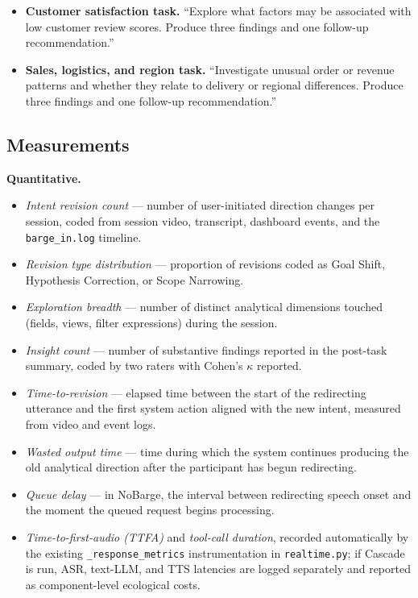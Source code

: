 \documentclass[journal]{IEEEtran}
\begin{document}
\begin{itemize}
\item \textbf{Customer satisfaction task.} ``Explore what factors may be associated with low customer review scores. Produce three findings and one follow-up recommendation.''
\item \textbf{Sales, logistics, and region task.} ``Investigate unusual order or revenue patterns and whether they relate to delivery or regional differences. Produce three findings and one follow-up recommendation.''
\end{itemize}

\subsection{Measurements}
\textbf{Quantitative.}
\begin{itemize}
\item \emph{Intent revision count} --- number of user-initiated direction changes per session, coded from session video, transcript, dashboard events, and the \texttt{barge\_in.log} timeline.
\item \emph{Revision type distribution} --- proportion of revisions coded as Goal Shift, Hypothesis Correction, or Scope Narrowing.
\item \emph{Exploration breadth} --- number of distinct analytical dimensions touched (fields, views, filter expressions) during the session.
\item \emph{Insight count} --- number of substantive findings reported in the post-task summary, coded by two raters with Cohen's $\kappa$ reported.
\item \emph{Time-to-revision} --- elapsed time between the start of the redirecting utterance and the first system action aligned with the new intent, measured from video and event logs.
\item \emph{Wasted output time} --- time during which the system continues producing the old analytical direction after the participant has begun redirecting.
\item \emph{Queue delay} --- in NoBarge, the interval between redirecting speech onset and the moment the queued request begins processing.
\item \emph{Time-to-first-audio (TTFA)} and \emph{tool-call duration}, recorded automatically by the existing \texttt{\_response\_metrics} instrumentation in \texttt{realtime.py}; if Cascade is run, ASR, text-LLM, and TTS latencies are logged separately and reported as component-level ecological costs.
\end{itemize}
\end{document}
